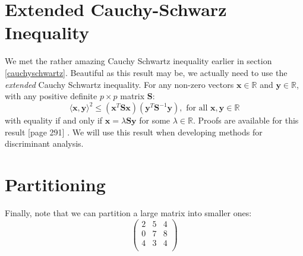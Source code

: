 


\section{Extended Cauchy-Schwarz Inequality}

We met the rather amazing Cauchy Schwartz inequality earlier in section \ref{cauchyschwartz}.   Beautiful as this result may be, we actually need to use the \emph{extended} Cauchy Schwartz inequality.   For any non-zero vectors $\boldsymbol{x} \in \mathbb{R}$ and $\boldsymbol{y} \in \mathbb{R}$, with any positive definite $p \times p$ matrix $\boldsymbol{S}$:
\begin{displaymath}
\langle \boldsymbol{x}, \boldsymbol{y} \rangle^{2} \leq (\boldsymbol{x}^{T}\boldsymbol{S} \boldsymbol{x})(\boldsymbol{y}^{T}\boldsymbol{S}^{-1} \boldsymbol{y}), \mbox{ for all } \boldsymbol{x}, \boldsymbol{y} \in \mathbb{R}
\end{displaymath}
with equality if and only if $\boldsymbol{x} = \lambda \boldsymbol{S}\boldsymbol{y}$ for some $\lambda \in \mathbb{R}$.  Proofs are available for this result [page 291] \cite{Flury:1997}.   We will use this result when developing methods for discriminant analysis.

\section{Partitioning}

Finally, note that we can partition a large matrix into smaller ones:
\begin{displaymath}
\left( \begin{array}{rr|r} 2 & 5 & 4 \\
\hline 
0 & 7 & 8 \\ 
4 & 3 & 4\\ 
\end{array} 
\right)
\end{displaymath}

